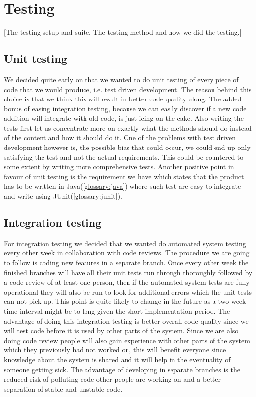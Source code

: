 \section{Testing}\label{Testing}
    [The testing setup and suite. The testing method and how we did the testing.]
    
    \subsection{Unit testing}\label{Unit testing}
    We decided quite early on that we wanted to do unit testing of every piece of code that we would produce, i.e. test driven development. The reason behind this choice is that we think this will result in better code quality along. The added bonus of easing integration testing, because we can easily discover if a new code addition will integrate with old code, is just icing on the cake. Also writing the tests first let us concentrate more on exactly what the methods should do instead of the content and how it should do it. One of the problems with test driven development however is, the possible bias that could occur, we could end up only satisfying the test and not the actual requirements. This could be countered to some extent by writing more comprehensive tests. Another positive point in favour of unit testing is the requirement we have which states that the product has to be written in Java(\ref{glossary:java}) where such test are easy to integrate and write using JUnit(\ref{glossary:junit}).

    \subsection{Integration testing}\label{Integration testing}
    For integration testing we decided that we wanted do automated system testing every other week in collaboration with code reviews. The procedure we are going to follow is coding new features in a separate branch. Once every other week the finished branches will have all their unit tests run through thoroughly followed by a code review of at least one person, then if the automated system tests are fully operational they will also be run to look for additional errors which the unit tests can not pick up. This point is quite likely to change in the future as a two week time interval might be to long given the short implementation period. The advantage of doing this integration testing is better overall code quality since we will test code before it is used by other parts of the system. Since we are also doing code review people will also gain experience with other parts of the system which they previously had not worked on, this will benefit everyone since knowledge about the system is shared and it will help in the eventuality of someone getting sick. The advantage of developing in separate branches is the reduced risk of polluting code other people are working on and a better separation of stable and unstable code.

